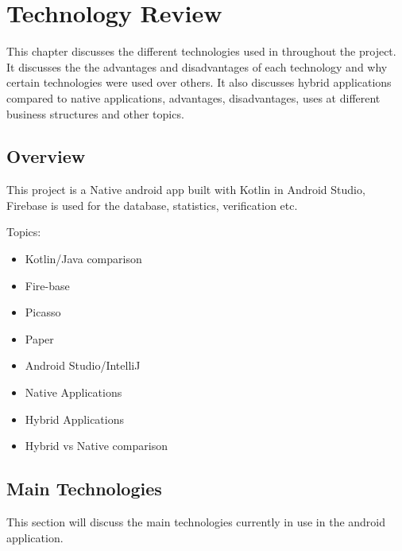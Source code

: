 \chapter{Technology Review}
This chapter discusses the different technologies used in throughout the
project. It discusses the the advantages and disadvantages of each technology 
and why certain technologies were used over others. It also discusses hybrid applications compared to native applications, advantages, disadvantages, uses at different business structures and other topics.

\section{Overview}
This project is a Native android app built with Kotlin in Android Studio, Firebase is used for the database, statistics, verification etc.

Topics:
\begin{itemize}
    \item Kotlin/Java comparison
    \item Fire-base
    \item Picasso
    \item Paper
    \item Android Studio/IntelliJ
    \item Native Applications
    \item Hybrid Applications
    \item Hybrid vs Native comparison 
\end{itemize}
\newpage

\section{Main Technologies}
This section will discuss the main technologies currently in use in the android application.
